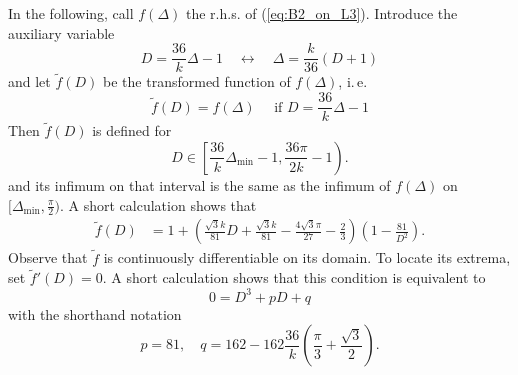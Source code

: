 \documentclass{article}
\newcommand{\ite}{i.\,e.\xspace}
\begin{document}
In the following, call $f(\Delta)$ the r.h.s. of (\ref{eq:B2_on_L3}).
Introduce the auxiliary variable
\[D = \frac{36}{k}\Delta - 1 \quad \leftrightarrow \quad \Delta = \frac{k}{36}(D+1)\]
and let $\tilde f(D)$ be the transformed function of $f(\Delta)$, \ite
\[\tilde f(D) = f(\Delta) \quad \text{ if } D = \frac{36}{k}\Delta - 1\]
Then $\tilde f(D)$ is defined for
\[D\in\left[\frac{36}{k}\Delta_{\text{min}}-1, \frac{36\pi}{2k}-1\right).\]
and its infimum on that interval is the same as the infimum of $f(\Delta)$ on $[\Delta_{\text{min}}, \frac\pi 2)$.
A short calculation shows that
\begin{align}
    \tilde f(D) %
     &= 1 + \left(\frac{\sqrt 3k}{81}D+\frac{\sqrt 3k}{81}-\frac{4\sqrt 3\pi}{27} - \frac 23\right)\left( 1-\frac{81}{D^2}\right).
\end{align}
Observe that $\tilde f$ is continuously differentiable on its domain. To locate its extrema, set $\tilde f'(D) = 0$. A short calculation shows that this condition is equivalent to
\begin{equation} \label{eq:third_deg_polynomial}
    0 = D^3 + p D + q 
\end{equation}
with the shorthand notation
\[p  = 81, \quad q = 162 - 162\frac{36}{k}(\frac\pi 3 + \frac{\sqrt 3}{2}).\]

\end{document}
